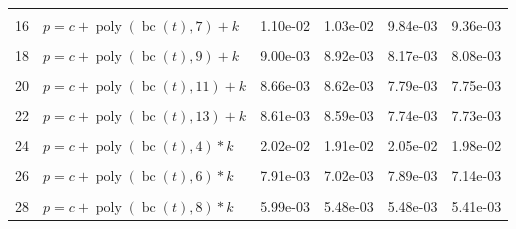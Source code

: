 \documentclass[12pt,a4paper]{article}
\DeclareMathOperator{\bc}{bc}
\DeclareMathOperator{\poly}{poly}
\begin{document}
\begin{longtable}[t]{ll>{\raggedleft\arraybackslash}p{2cm}>{\raggedleft\arraybackslash}p{2cm}>{\raggedleft\arraybackslash}p{2cm}>{\raggedleft\arraybackslash}p{2cm}}
\cellcolor{gray!6}{15} & \cellcolor{gray!6}{$p = c + \poly\left( \bc(t), 6 \right) + k$} & \cellcolor{gray!6}{1.10e-02} & \cellcolor{gray!6}{1.03e-02} & \cellcolor{gray!6}{1.01e-02} & \cellcolor{gray!6}{9.49e-03}\\
16 & $p = c + \poly\left( \bc(t), 7 \right) + k$ & 1.10e-02 & 1.03e-02 & 9.84e-03 & 9.36e-03\\
\cellcolor{gray!6}{17} & \cellcolor{gray!6}{$p = c + \poly\left( \bc(t), 8 \right) + k$} & \cellcolor{gray!6}{9.71e-03} & \cellcolor{gray!6}{9.38e-03} & \cellcolor{gray!6}{8.33e-03} & \cellcolor{gray!6}{8.28e-03}\\
18 & $p = c + \poly\left( \bc(t), 9 \right) + k$ & 9.00e-03 & 8.92e-03 & 8.17e-03 & 8.08e-03\\
\cellcolor{gray!6}{19} & \cellcolor{gray!6}{$p = c + \poly\left( \bc(t), 10 \right) + k$} & \cellcolor{gray!6}{8.74e-03} & \cellcolor{gray!6}{8.70e-03} & \cellcolor{gray!6}{7.80e-03} & \cellcolor{gray!6}{7.78e-03}\\
20 & $p = c + \poly\left( \bc(t), 11 \right) + k$ & 8.66e-03 & 8.62e-03 & 7.79e-03 & 7.75e-03\\
\cellcolor{gray!6}{21} & \cellcolor{gray!6}{$p = c + \poly\left( \bc(t), 12 \right) + k$} & \cellcolor{gray!6}{8.65e-03} & \cellcolor{gray!6}{8.62e-03} & \cellcolor{gray!6}{7.77e-03} & \cellcolor{gray!6}{7.74e-03}\\
22 & $p = c + \poly\left( \bc(t), 13 \right) + k$ & 8.61e-03 & 8.59e-03 & 7.74e-03 & 7.73e-03\\
\cellcolor{gray!6}{23} & \cellcolor{gray!6}{$p = c + \poly\left( \bc(t), 3 \right) * k$} & \cellcolor{gray!6}{3.30e-02} & \cellcolor{gray!6}{2.03e-02} & \cellcolor{gray!6}{2.17e-02} & \cellcolor{gray!6}{2.02e-02}\\
24 & $p = c + \poly\left( \bc(t), 4 \right) * k$ & 2.02e-02 & 1.91e-02 & 2.05e-02 & 1.98e-02\\
\cellcolor{gray!6}{25} & \cellcolor{gray!6}{$p = c + \poly\left( \bc(t), 5 \right) * k$} & \cellcolor{gray!6}{1.71e-02} & \cellcolor{gray!6}{1.66e-02} & \cellcolor{gray!6}{1.43e-02} & \cellcolor{gray!6}{1.41e-02}\\
26 & $p = c + \poly\left( \bc(t), 6 \right) * k$ & 7.91e-03 & 7.02e-03 & 7.89e-03 & 7.14e-03\\
\cellcolor{gray!6}{27} & \cellcolor{gray!6}{$p = c + \poly\left( \bc(t), 7 \right) * k$} & \cellcolor{gray!6}{7.70e-03} & \cellcolor{gray!6}{6.70e-03} & \cellcolor{gray!6}{7.28e-03} & \cellcolor{gray!6}{6.75e-03}\\
28 & $p = c + \poly\left( \bc(t), 8 \right) * k$ & 5.99e-03 & 5.48e-03 & 5.48e-03 & 5.41e-03\\

\end{longtable}
\end{document}
